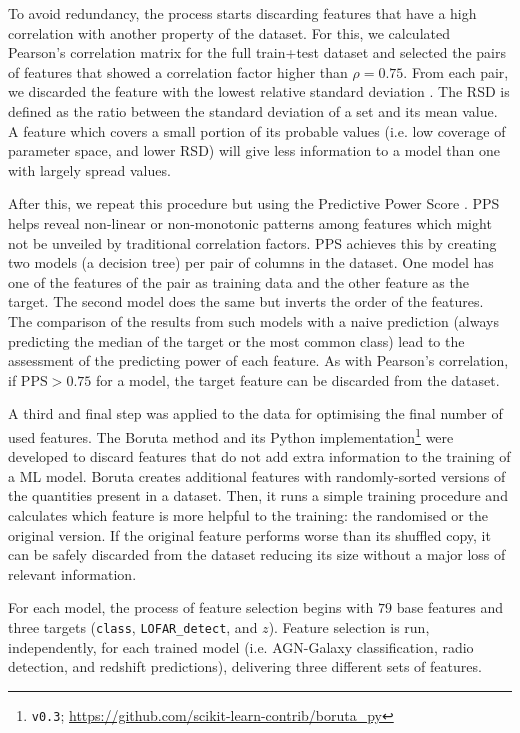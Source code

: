\documentclass{aa}
\begin{document}
To avoid redundancy, the process starts discarding features that have a high correlation with another property of the dataset.
For this, we calculated Pearson's correlation matrix for the full train+test dataset and selected the pairs of features that showed a correlation factor higher than $\rho = 0.75$. From each pair, we discarded the feature with the lowest relative standard deviation \citep[RSD;][]{johnson1964statistics}. The RSD is defined as the ratio between the standard deviation of a set and its mean value. A feature which covers a small portion of its probable values (i.e. low coverage of parameter space, and lower RSD) will give less information to a model than one with largely spread values.

After this, we repeat this procedure but using the Predictive Power Score \citep[PPS, \texttt{v1.2.0};][]{PPSsoftware}. PPS helps reveal non-linear or non-monotonic patterns among features which might not be unveiled by traditional correlation factors. PPS achieves this by creating two models (a decision tree) per pair of columns in the dataset. One model has one of the features of the pair as training data and the other feature as the target. The second model does the same but inverts the order of the features. The comparison of the results from such models with a naive prediction (always predicting the median of the target or the most common class) lead to the assessment of the predicting power of each feature. As with Pearson's correlation, if $\mathrm{PPS} > 0.75$ for a model, the target feature can be discarded from the dataset.

A third and final step was applied to the data for optimising the final number of used features. The Boruta method \citep{JSSv036i11} and its Python implementation\footnote{\texttt{v0.3}; \url{https://github.com/scikit-learn-contrib/boruta_py}} were developed to discard features that do not add extra information to the training of a ML model. Boruta creates additional features with randomly-sorted versions of the quantities present in a dataset. Then, it runs a simple training procedure and calculates which feature is more helpful to the training: the randomised or the original version. If the original feature performs worse than its shuffled copy, it can be safely discarded from the dataset reducing its size without a major loss of relevant information.

For each model, the process of feature selection begins with $79$ base features and three targets (\verb|class|, \verb|LOFAR_detect|, and $z$). Feature selection is run, independently, for each trained model (i.e. AGN-Galaxy classification, radio detection, and redshift predictions), delivering three different sets of features.
\end{document}
